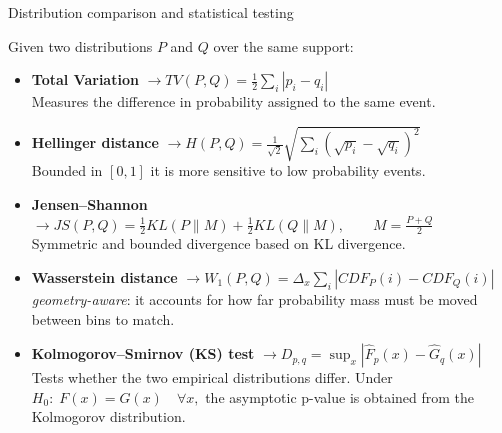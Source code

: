 \begin{frame}{Distribution comparison and statistical testing}

Given two distributions $P$ and $Q$ over the same support:
\vspace{0.5cm}
\begin{itemize}

    \item \textbf{Total Variation} $\rightarrow TV(P,Q)=\frac{1}{2}\sum_i |p_i-q_i|$\\
    Measures the difference in probability
    assigned to the same event. 
    \vspace {0.4cm}
    \item \textbf{Hellinger distance} $\rightarrow H(P,Q)=\frac{1}{\sqrt{2}}\sqrt{\sum_i(\sqrt{p_i}-\sqrt{q_i})^2}$\\
    Bounded in $[0,1]$ it is more sensitive to low probability events.
    \vspace {0.4cm}
    \item \textbf{Jensen--Shannon} $\rightarrow JS(P,Q)=\frac{1}{2}KL(P\|M)+\frac{1}{2}KL(Q\|M),\qquad M=\frac{P+Q}{2}$\\
    Symmetric and bounded divergence based on KL divergence.
    \vspace{0.4cm}
    \item \textbf{Wasserstein distance} $\rightarrow W_1(P,Q)=\Delta_x\sum_i|CDF_P(i)-CDF_Q(i)|$\\
    \emph{geometry-aware}: it accounts for how far
    probability mass must be moved between bins to match.

    \vspace{0.4cm}
    \item \textbf{Kolmogorov--Smirnov (KS) test} $\rightarrow D_{p,q}=\sup_x|\hat F_p(x)-\hat G_q(x)|$\\
    Tests whether the two empirical distributions differ. Under $H_0:\;F(x)=G(x)\quad\forall x,$ 
    the asymptotic p-value is obtained from the Kolmogorov distribution.

\end{itemize}
\end{frame}


